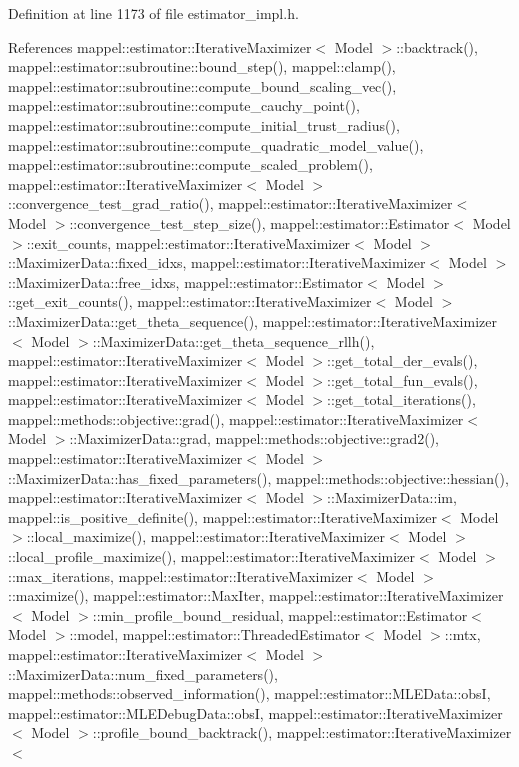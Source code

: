 Definition at line 1173 of file estimator\+\_\+impl.\+h.



References mappel\+::estimator\+::\+Iterative\+Maximizer$<$ Model $>$\+::backtrack(), mappel\+::estimator\+::subroutine\+::bound\+\_\+step(), mappel\+::clamp(), mappel\+::estimator\+::subroutine\+::compute\+\_\+bound\+\_\+scaling\+\_\+vec(), mappel\+::estimator\+::subroutine\+::compute\+\_\+cauchy\+\_\+point(), mappel\+::estimator\+::subroutine\+::compute\+\_\+initial\+\_\+trust\+\_\+radius(), mappel\+::estimator\+::subroutine\+::compute\+\_\+quadratic\+\_\+model\+\_\+value(), mappel\+::estimator\+::subroutine\+::compute\+\_\+scaled\+\_\+problem(), mappel\+::estimator\+::\+Iterative\+Maximizer$<$ Model $>$\+::convergence\+\_\+test\+\_\+grad\+\_\+ratio(), mappel\+::estimator\+::\+Iterative\+Maximizer$<$ Model $>$\+::convergence\+\_\+test\+\_\+step\+\_\+size(), mappel\+::estimator\+::\+Estimator$<$ Model $>$\+::exit\+\_\+counts, mappel\+::estimator\+::\+Iterative\+Maximizer$<$ Model $>$\+::\+Maximizer\+Data\+::fixed\+\_\+idxs, mappel\+::estimator\+::\+Iterative\+Maximizer$<$ Model $>$\+::\+Maximizer\+Data\+::free\+\_\+idxs, mappel\+::estimator\+::\+Estimator$<$ Model $>$\+::get\+\_\+exit\+\_\+counts(), mappel\+::estimator\+::\+Iterative\+Maximizer$<$ Model $>$\+::\+Maximizer\+Data\+::get\+\_\+theta\+\_\+sequence(), mappel\+::estimator\+::\+Iterative\+Maximizer$<$ Model $>$\+::\+Maximizer\+Data\+::get\+\_\+theta\+\_\+sequence\+\_\+rllh(), mappel\+::estimator\+::\+Iterative\+Maximizer$<$ Model $>$\+::get\+\_\+total\+\_\+der\+\_\+evals(), mappel\+::estimator\+::\+Iterative\+Maximizer$<$ Model $>$\+::get\+\_\+total\+\_\+fun\+\_\+evals(), mappel\+::estimator\+::\+Iterative\+Maximizer$<$ Model $>$\+::get\+\_\+total\+\_\+iterations(), mappel\+::methods\+::objective\+::grad(), mappel\+::estimator\+::\+Iterative\+Maximizer$<$ Model $>$\+::\+Maximizer\+Data\+::grad, mappel\+::methods\+::objective\+::grad2(), mappel\+::estimator\+::\+Iterative\+Maximizer$<$ Model $>$\+::\+Maximizer\+Data\+::has\+\_\+fixed\+\_\+parameters(), mappel\+::methods\+::objective\+::hessian(), mappel\+::estimator\+::\+Iterative\+Maximizer$<$ Model $>$\+::\+Maximizer\+Data\+::im, mappel\+::is\+\_\+positive\+\_\+definite(), mappel\+::estimator\+::\+Iterative\+Maximizer$<$ Model $>$\+::local\+\_\+maximize(), mappel\+::estimator\+::\+Iterative\+Maximizer$<$ Model $>$\+::local\+\_\+profile\+\_\+maximize(), mappel\+::estimator\+::\+Iterative\+Maximizer$<$ Model $>$\+::max\+\_\+iterations, mappel\+::estimator\+::\+Iterative\+Maximizer$<$ Model $>$\+::maximize(), mappel\+::estimator\+::\+Max\+Iter, mappel\+::estimator\+::\+Iterative\+Maximizer$<$ Model $>$\+::min\+\_\+profile\+\_\+bound\+\_\+residual, mappel\+::estimator\+::\+Estimator$<$ Model $>$\+::model, mappel\+::estimator\+::\+Threaded\+Estimator$<$ Model $>$\+::mtx, mappel\+::estimator\+::\+Iterative\+Maximizer$<$ Model $>$\+::\+Maximizer\+Data\+::num\+\_\+fixed\+\_\+parameters(), mappel\+::methods\+::observed\+\_\+information(), mappel\+::estimator\+::\+M\+L\+E\+Data\+::obsI, mappel\+::estimator\+::\+M\+L\+E\+Debug\+Data\+::obsI, mappel\+::estimator\+::\+Iterative\+Maximizer$<$ Model $>$\+::profile\+\_\+bound\+\_\+backtrack(), mappel\+::estimator\+::\+Iterative\+Maximizer$<$ 